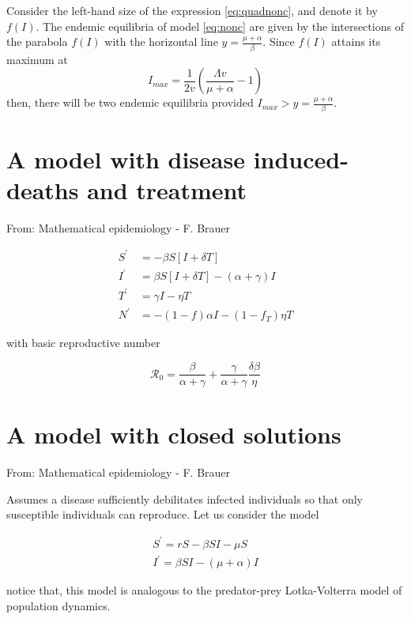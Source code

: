 \documentclass{book}
\begin{document}
Consider the left-hand size of the expression \eqref{eq:quadnonc}, and denote it by $f(I)$. The endemic equilibria of model \eqref{eq:nonc} are given by the intersections of the parabola $f(I)$ with the horizontal line $y=\frac{\mu+\alpha}{\beta}$.
Since $f(I)$ attains its maximum at \begin{equation}
I_{max}=\frac{1}{2 v}\left(\frac{\Lambda v}{\mu+\alpha}-1\right)
\end{equation}
then, there will be two endemic equilibria provided $I_{max}>y=\frac{\mu+\alpha}{\beta}$.

\section{A model with disease induced-deaths and treatment}
From: Mathematical epidemiology - F. Brauer

\begin{align}
S^{\prime} &=-\beta S[I+\delta T] \\ 
I^{\prime} &=\beta S[I+\delta T]-(\alpha+\gamma) I \\ 
T^{\prime} &=\gamma I-\eta T \\ N^{\prime} &=-(1-f) \alpha I-\left(1-f_{T}\right) \eta T 
\end{align}

with basic reproductive number

\begin{equation}
\mathcal{R}_{0}=\frac{\beta}{\alpha+\gamma}+\frac{\gamma}{\alpha+\gamma} \frac{\delta \beta}{\eta}
\end{equation}

\section{A model with closed solutions}
From: Mathematical epidemiology - F. Brauer

Assumes a disease sufficiently debilitates infected individuals so that only susceptible individuals can reproduce. Let us consider the model

\begin{equation}
\begin{array}{l}
S^{\prime}=r S-\beta S I-\mu S \\
I^{\prime}=\beta S I-(\mu+\alpha) I
\end{array}
\end{equation}

notice that, this model is analogous to the predator-prey Lotka-Volterra model of population dynamics.
\end{document}
